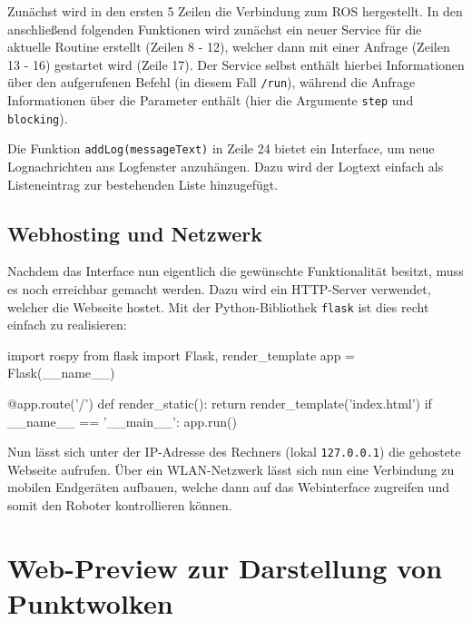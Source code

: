 Zunächst wird in den ersten 5 Zeilen die Verbindung zum ROS hergestellt. In den
anschließend folgenden Funktionen wird zunächst ein neuer Service für die aktuelle
Routine erstellt (Zeilen 8 - 12), welcher dann mit einer Anfrage (Zeilen 13 - 16)
gestartet wird (Zeile 17). Der Service selbst enthält hierbei Informationen über
den aufgerufenen Befehl (in diesem Fall \texttt{/run}), während die Anfrage Informationen
über die Parameter enthält (hier die Argumente \texttt{step} und \texttt{blocking}).

Die Funktion \texttt{addLog(messageText)} in Zeile 24 bietet ein Interface, um neue
Lognachrichten ans Logfenster anzuhängen. Dazu wird der Logtext einfach als Listeneintrag
zur bestehenden Liste hinzugefügt.


\subsection{Webhosting und Netzwerk}

Nachdem das Interface nun eigentlich die gewünschte Funktionalität besitzt, muss
es noch erreichbar gemacht werden. Dazu wird ein HTTP-Server verwendet, welcher
die Webseite hostet. Mit der Python-Bibliothek \texttt{flask} ist dies recht einfach
zu realisieren:

\begin{code}[language=python, caption={Python-Skript zum Hosten des Webservers}]
import rospy
from flask import Flask, render_template
app = Flask(__name__)

@app.route('/')
def render_static():
    return render_template('index.html')
if __name__ == '__main__':
    app.run()
\end{code}

Nun lässt sich unter der IP-Adresse des Rechners (lokal \texttt{127.0.0.1}) die
gehostete Webseite aufrufen. Über ein WLAN-Netzwerk lässt sich nun eine Verbindung
zu mobilen Endgeräten aufbauen, welche dann auf das Webinterface zugreifen und somit
den Roboter kontrollieren können.



\section{Web-Preview zur Darstellung von Punktwolken}


